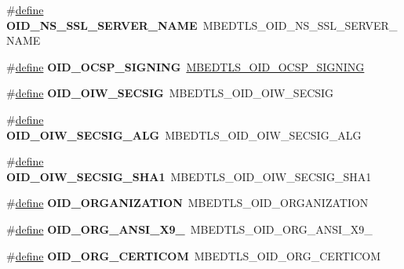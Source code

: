 \begin{DoxyCompactItemize}
\#\hyperlink{structdefine}{define} {\bfseries O\+I\+D\+\_\+\+N\+S\+\_\+\+S\+S\+L\+\_\+\+S\+E\+R\+V\+E\+R\+\_\+\+N\+A\+ME}~M\+B\+E\+D\+T\+L\+S\+\_\+\+O\+I\+D\+\_\+\+N\+S\+\_\+\+S\+S\+L\+\_\+\+S\+E\+R\+V\+E\+R\+\_\+\+N\+A\+ME
\item 
\mbox{\label{compat-1_83_8h_aec2ececc47079440c7bc3c024516f593}} 
\#\hyperlink{structdefine}{define} {\bfseries O\+I\+D\+\_\+\+O\+C\+S\+P\+\_\+\+S\+I\+G\+N\+I\+NG}~\hyperlink{oid_8h_aad03a9c85a0c3f922095e3cf6fb7d9c4}{M\+B\+E\+D\+T\+L\+S\+\_\+\+O\+I\+D\+\_\+\+O\+C\+S\+P\+\_\+\+S\+I\+G\+N\+I\+NG}
\item 
\mbox{\label{compat-1_83_8h_a19017338b914b7512bc685c38b5349fc}} 
\#\hyperlink{structdefine}{define} {\bfseries O\+I\+D\+\_\+\+O\+I\+W\+\_\+\+S\+E\+C\+S\+IG}~M\+B\+E\+D\+T\+L\+S\+\_\+\+O\+I\+D\+\_\+\+O\+I\+W\+\_\+\+S\+E\+C\+S\+IG
\item 
\mbox{\label{compat-1_83_8h_a92faf86a534a95db58fcf6ea47b2b906}} 
\#\hyperlink{structdefine}{define} {\bfseries O\+I\+D\+\_\+\+O\+I\+W\+\_\+\+S\+E\+C\+S\+I\+G\+\_\+\+A\+LG}~M\+B\+E\+D\+T\+L\+S\+\_\+\+O\+I\+D\+\_\+\+O\+I\+W\+\_\+\+S\+E\+C\+S\+I\+G\+\_\+\+A\+LG
\item 
\mbox{\label{compat-1_83_8h_aeff120691691d3875a336684c165b0c3}} 
\#\hyperlink{structdefine}{define} {\bfseries O\+I\+D\+\_\+\+O\+I\+W\+\_\+\+S\+E\+C\+S\+I\+G\+\_\+\+S\+H\+A1}~M\+B\+E\+D\+T\+L\+S\+\_\+\+O\+I\+D\+\_\+\+O\+I\+W\+\_\+\+S\+E\+C\+S\+I\+G\+\_\+\+S\+H\+A1
\item 
\mbox{\label{compat-1_83_8h_affbfc37a57f282fd62a6d0176d7b0500}} 
\#\hyperlink{structdefine}{define} {\bfseries O\+I\+D\+\_\+\+O\+R\+G\+A\+N\+I\+Z\+A\+T\+I\+ON}~M\+B\+E\+D\+T\+L\+S\+\_\+\+O\+I\+D\+\_\+\+O\+R\+G\+A\+N\+I\+Z\+A\+T\+I\+ON
\item 
\mbox{\label{compat-1_83_8h_aa2bce4550293376342972b70ef659ed8}} 
\#\hyperlink{structdefine}{define} {\bfseries O\+I\+D\+\_\+\+O\+R\+G\+\_\+\+A\+N\+S\+I\+\_\+\+X9\+\_}~M\+B\+E\+D\+T\+L\+S\+\_\+\+O\+I\+D\+\_\+\+O\+R\+G\+\_\+\+A\+N\+S\+I\+\_\+\+X9\+\_
\item 
\mbox{\label{compat-1_83_8h_a0a3d78b1d90564e21bec9b8e1f417f59}} 
\#\hyperlink{structdefine}{define} {\bfseries O\+I\+D\+\_\+\+O\+R\+G\+\_\+\+C\+E\+R\+T\+I\+C\+OM}~M\+B\+E\+D\+T\+L\+S\+\_\+\+O\+I\+D\+\_\+\+O\+R\+G\+\_\+\+C\+E\+R\+T\+I\+C\+OM

\end{DoxyCompactItemize}
